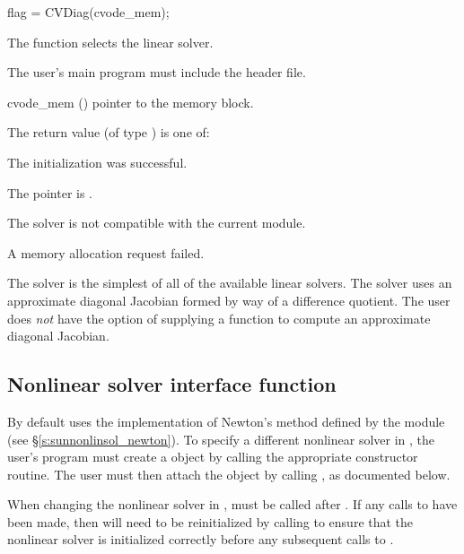 {
  flag = CVDiag(cvode\_mem);
}
{
  The function  selects the {\cvdiag} linear solver.

  The user's main program must include the  header file.
}
{
  \begin{args}
  \item[cvode\_mem] ()
    pointer to the {\cvodes} memory block.
  \end{args}
}
{
  The return value  (of type ) is one of:
  \begin{args}
  \item[\Id{CVDIAG\_SUCCESS}]
    The {\cvdiag} initialization was successful.
  \item[\Id{CVDIAG\_MEM\_NULL}]
    The  pointer is .
  \item[\Id{CVDIAG\_ILL\_INPUT}]
    The {\cvdiag} solver is not compatible with the current {\nvector} module.
  \item[\Id{CVDIAG\_MEM\_FAIL}]
    A memory allocation request failed.
  \end{args}
}
{
  The {\cvdiag} solver is the simplest of all of the available {\cvodes}
  linear solvers.  The {\cvdiag} solver uses an approximate
  diagonal Jacobian formed by way of a difference quotient. The user
  does {\em not} have the option of supplying a function to compute an
  approximate diagonal Jacobian.
}
\subsection{Nonlinear solver interface function}
\label{ss:nonlin_solv_init}

By default {\cvodes} uses the {\sunnonlinsol} implementation of Newton's method
defined by the {\sunnonlinsolnewton} module (see \S\ref{s:sunnonlinsol_newton}).
To specify a different nonlinear solver in {\cvodes}, the user's program must
create a {\sunnonlinsol} object by calling the appropriate constructor routine.
The user must then attach the {\sunnonlinsol} object by calling
, as documented below.

When changing the nonlinear solver in {\cvodes},  must
be called after . If any calls to  have been made, then
{\cvodes} will need to be reinitialized by calling  to ensure
that the nonlinear solver is initialized correctly before any subsequent calls
to .

